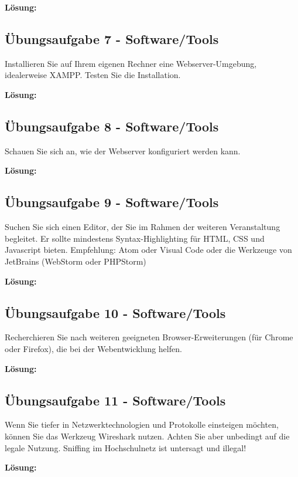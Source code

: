 \documentclass[11pt,a4paper,DIV=12]{scrartcl}
\newcommand{\loesung}{\textbf{Lösung:}\\}
\begin{document}
\loesung

\subsection{Übungsaufgabe 7 - Software/Tools}
Installieren Sie auf Ihrem eigenen Rechner eine Webserver-Umgebung, idealerweise XAMPP. Testen Sie die Installation.

\loesung

\subsection{Übungsaufgabe 8 - Software/Tools}
Schauen Sie sich an, wie der Webserver konfiguriert werden kann.

\loesung

\subsection{Übungsaufgabe 9 - Software/Tools}
Suchen Sie sich einen Editor, der Sie im Rahmen der weiteren Veranstaltung begleitet. Er sollte mindestens Syntax-Highlighting für HTML, CSS und Javascript bieten. Empfehlung: Atom oder Visual Code oder die Werkzeuge von JetBrains (WebStorm oder PHPStorm)

\loesung

\subsection{Übungsaufgabe 10 - Software/Tools}
Recherchieren Sie nach weiteren geeigneten Browser-Erweiterungen (für Chrome oder Firefox), die bei der Webentwicklung helfen.

\loesung

\subsection{Übungsaufgabe 11 - Software/Tools}
Wenn Sie tiefer in Netzwerktechnologien und Protokolle einsteigen möchten, können Sie das Werkzeug Wireshark nutzen. Achten Sie aber unbedingt auf die legale Nutzung. Sniffing im Hochschulnetz ist untersagt und illegal!

\loesung
\end{document}
